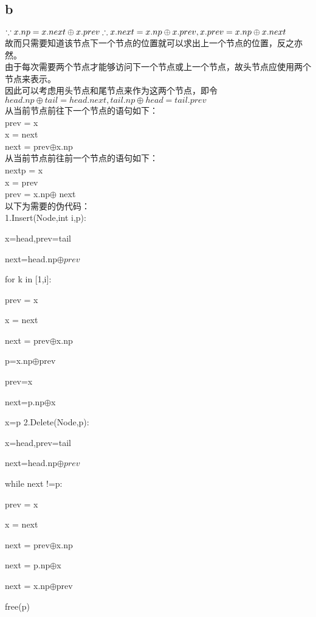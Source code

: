 \documentclass[12pt,a4paper]{article}
\begin{document}
\subsection{b}
$\because x.np=x.next\oplus x.prev\\
    \therefore x.next=x.np\oplus x.prev,x.prev=x.np\oplus x.next$\\
故而只需要知道该节点下一个节点的位置就可以求出上一个节点的位置，反之亦然。\\
由于每次需要两个节点才能够访问下一个节点或上一个节点，故头节点应使用两个节点来表示。\\
因此可以考虑用头节点和尾节点来作为这两个节点，即令\\$head.np\oplus tail=head.next,tail.np\oplus head=tail.prev$\\
    从当前节点前往下一个节点的语句如下：\\
    prev = x\\
    x = next\\
    next = prev$\oplus$x.np\\
    从当前节点前往前一个节点的语句如下：\\
    nextp = x\\
    x = prev\\
    prev = x.np$\oplus$ next\\
    以下为需要的伪代码：\\
    1.Insert(Node,int i,p):
    \par\setlength\parindent{2em}x=head,prev=tail
    \par\setlength\parindent{2em}next=head.np$\oplus prev$
    \par\setlength\parindent{2em}for k in [1,i]:
    \par\setlength\parindent{4em}prev = x
    \par\setlength\parindent{4em}x = next
    \par\setlength\parindent{4em}next = prev$\oplus$x.np
    \par\setlength\parindent{2em}p=x.np$\oplus$prev
    \par\setlength\parindent{2em}prev=x
    \par\setlength\parindent{2em}next=p.np$\oplus$x
    \par\setlength\parindent{2em}x=p
    2.Delete(Node,p):
    \par\setlength\parindent{2em}x=head,prev=tail
    \par\setlength\parindent{2em}next=head.np$\oplus prev$
    \par\setlength\parindent{2em}while next !=p:
    \par\setlength\parindent{4em}prev = x
    \par\setlength\parindent{4em}x = next
    \par\setlength\parindent{4em}next = prev$\oplus$x.np
    \par\setlength\parindent{2em}next = p.np$\oplus$x
    \par\setlength\parindent{2em}next = x.np$\oplus$prev
    \par\setlength\parindent{2em}free(p)
\end{document}
